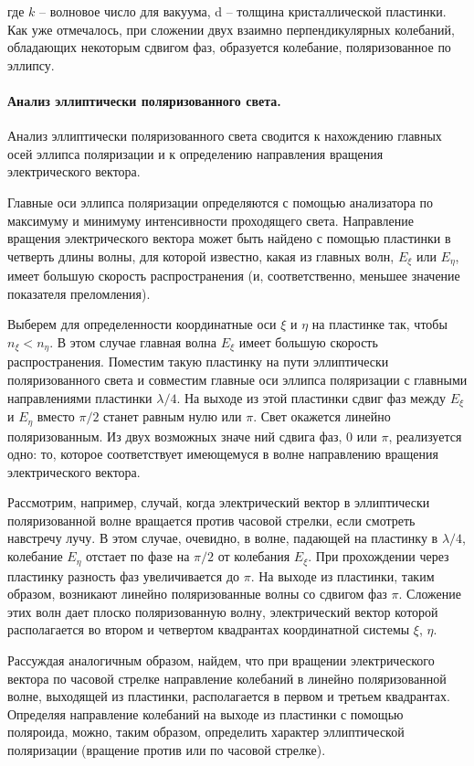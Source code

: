 \documentclass[a4paper, 12pt, twoside]{article}
\begin{document}
	 где $k$ -- волновое число для вакуума, d -- толщина кристаллической пластинки. Как уже отмечалось, при сложении двух взаимно перпендикулярных колебаний, обладающих некоторым сдвигом фаз, образуется колебание, поляризованное по эллипсу.
	 
	 \paragraph{Анализ эллиптически поляризованного света.} Анализ эллиптически поляризованного света сводится к нахождению главных осей эллипса поляризации и к определению направления вращения электрического вектора. 
	 
	 Главные оси эллипса поляризации определяются с помощью анализатора по максимуму и минимуму интенсивности проходящего света. Направление вращения электрического вектора может быть найдено с
	 помощью пластинки в четверть длины волны, для которой известно, какая из главных волн, $E_\xi$ или $E_\eta$, имеет большую скорость распространения (и, соответственно, меньшее значение показателя преломления).
	 
	 Выберем для определенности координатные оси $\xi$ и $\eta$ на пластинке так, чтобы
	 $n_\xi <
	 n_\eta$. В этом случае главная волна $E_\xi$ имеет большую скорость распространения. Поместим такую пластинку на пути эллиптически поляризованного света и совместим главные оси эллипса поляризации с главными направлениями пластинки $\lambda/4$. На выходе из этой пластинки сдвиг фаз между $E_\xi$ и $E_\eta$ вместо $\pi/2$ станет равным нулю или $\pi$. Свет окажется линейно поляризованным. Из двух возможных значе ний сдвига фаз, 0 или $\pi$, реализуется одно: то, которое соответствует имеющемуся в волне направлению вращения электрического вектора.
	 
	 Рассмотрим, например, случай, когда электрический вектор в эллиптически поляризованной волне вращается против часовой стрелки, если смотреть навстречу лучу. В этом случае, очевидно, в волне, падающей на пластинку в $\lambda/4$, колебание $E_\eta$ отстает по фазе на $ \pi/2$ от колебания $E_\xi$. При прохождении через пластинку разность фаз увеличивается до $\pi$. На выходе из пластинки, таким образом, возникают линейно поляризованные волны со сдвигом фаз $\pi$. Сложение этих волн дает плоско поляризованную волну, электрический вектор которой располагается во
	 втором и четвертом квадрантах координатной системы $\xi$, $\eta$.
	 
	 Рассуждая аналогичным образом, найдем, что при вращении электрического вектора по часовой стрелке направление колебаний в линейно поляризованной волне, выходящей из пластинки, располагается в первом и третьем квадрантах. Определяя направление колебаний на выходе из пластинки с помощью поляроида, можно, таким образом, определить характер эллиптической поляризации (вращение против или по часовой стрелке).
	 
\end{document}
